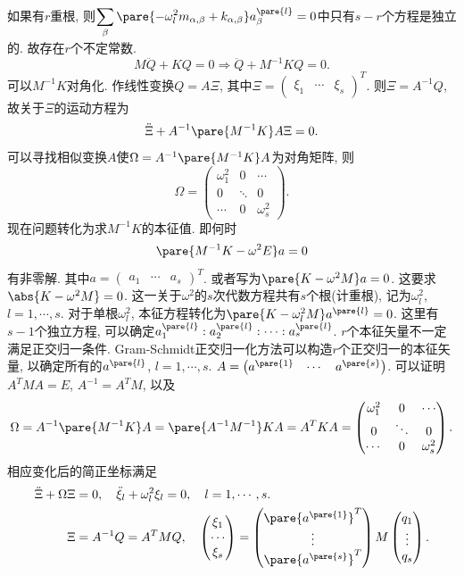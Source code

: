 \documentclass[../LectureNotes.tex]{subfiles}
\begin{document}
如果有$r$重根, 则$\displaystyle \sum_\beta \pare{-\omega_l^2 m_{\alpha,\beta}+k_{\alpha,\beta}} a_\beta^{\pare{l}} = 0$中只有$s-r$个方程是独立的. 故存在$r$个不定常数.
\[ M\ddot{Q} + KQ = 0 \Rightarrow \ddot{Q} + M^{-1}KQ = 0. \]
可以$M^{-1}K$对角化. 作线性变换$Q = A\Xi$, 其中$\Xi = \begin{pmatrix}
    \xi_1 & \cdots & \xi_s
\end{pmatrix}^T$. 则$\Xi = A^{-1}Q$, 故关于$\Xi$的运动方程为
\[ \ddot{\Xi} + A^{-1}\pare{M^{-1}K} A\Xi = 0. \]
可以寻找相似变换$A$使$\Omega = A^{-1}\pare{M^{-1}K}A$为对角矩阵, 则
\[ \Omega = \begin{pmatrix}
    \omega_1^2 & 0 & \cdots \\
    0 & \ddots & 0 \\
    \cdots & 0 & \omega_s^2
\end{pmatrix}. \]
现在问题转化为求$M^{-1}K$的本征值. 即何时
\[ \pare{M^{-1}K - \omega^2 E}a = 0 \]
有非零解. 其中$a = \begin{pmatrix}
    a_1 & \cdots & a_s
\end{pmatrix}^T$. 或者写为$\pare{K - \omega^2 M} a = 0$. 这要求$\abs{K - \omega^2 M} = 0$. 这一关于$\omega^2$的$s$次代数方程共有$s$个根(计重根), 记为$\omega_l^2$, $l=1,\cdots,s$. 对于单根$\omega_l^2$, 本征方程转化为$\pare{K-\omega_l^2 M}a^{\pare{l}} = 0$. 这里有$s-1$个独立方程, 可以确定$a_1^{\pare{l}} : a_2^{\pare{l}}:\cdots : a_s^{\pare{l}}$. $r$个本征矢量不一定满足正交归一条件. Gram-Schmidt正交归一化方法可以构造$r$个正交归一的本征矢量, 以确定所有的$a^{\pare{l}}$, $l=1,\cdots,s$. $A = \begin{pmatrix}
    a^{\pare{1}} & \cdots & a^{\pare{s}}
\end{pmatrix}$. 可以证明$A^TMA = E$, $A^{-1} = A^T M$, 以及
\[ \Omega = A^{-1}\pare{M^{-1}K} A = \pare{A^{-1}M^{-1}}KA = A^TKA = \begin{pmatrix}
    \omega_1^2 & 0 & \cdots \\
    0 & \ddots & 0 \\
    \cdots & 0 & \omega_s^2
\end{pmatrix}. \]
相应变化后的简正坐标满足
\begin{align*}
    \ddot{\Xi} + \Omega \Xi &= 0,\quad \ddot{\xi}_l + \omega_l^2 \xi_l = 0,\quad l = 1,\cdots, s. \\
    \Xi &= A^{-1}Q = A^TMQ,\quad \begin{pmatrix}
        \xi_1 \\ \cdots \\ \xi_s
    \end{pmatrix} = \begin{pmatrix}
        \pare{a^{\pare{1}}}^T \\ \vdots \\ \pare{a^{\pare{s}}}^T
    \end{pmatrix} M \begin{pmatrix}
        q_1 \\ \vdots \\ q_s
    \end{pmatrix}.
\end{align*}
\end{document}
